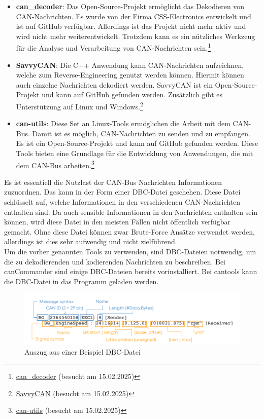 \begin{itemize}
    \item \textbf{can\_decoder}: Das Open-Source-Projekt ermöglicht das Dekodieren von CAN-Nachrichten. Es wurde von der Firma
    CSS-Electronics entwickelt und ist auf GitHub verfügbar. Allerdings ist das Projekt nicht mehr aktiv und wird nicht mehr
    weiterentwickelt. Trotzdem kann es ein nützliches Werkzeug für die Analyse und Verarbeitung von CAN-Nachrichten 
    sein.\footnote{\href{https://github.com/CSS-Electronics/can_decoder}{can\_decoder} (besucht am 15.02.2025)}
    \item \textbf{SavvyCAN}: Die C++ Anwendung kann CAN-Nachrichten aufzeichnen, welche zum Reverse-Engineering genutzt werden können.
    Hiermit können auch einzelne Nachrichten dekodiert werden. SavvyCAN ist ein Open-Source-Projekt und kann auf GitHub gefunden werden. 
    Zusätzlich gibt es Unterstützung auf Linux und Windows.\footnote{\href{https://savvycan.com/index.php}{SavvyCAN} (besucht am 15.02.2025)}
    \item \textbf{can-utils}: Diese Set an Linux-Tools ermöglichen die Arbeit mit dem CAN-Bus. Damit ist es möglich, CAN-Nachrichten 
    zu senden und zu empfangen.
    Es ist ein Open-Source-Projekt und kann auf GitHub gefunden werden. Diese Tools bieten eine Grundlage für die Entwicklung von 
    Anwendungen, die mit dem CAN-Bus arbeiten.\footnote{\href{https://github.com/linux-can/can-utils}{can-utils} (besucht am 15.02.2025)}
\end{itemize}
Es ist essentiell die Nutzlast der CAN-Bus Nachrichten Informationen zuzuordnen. Das kann in der Form einer DBC-Datei geschehen\cite{Choi2021}. 
Diese Datei schlüsselt auf, welche Informationen in den verschiedenen CAN-Nachrichten enthalten sind.
Da auch sensible Informationen in den Nachrichten enthalten sein können, wird diese Datei in den meisten 
Fällen nicht öffentlich verfügbar gemacht. Ohne diese Datei können zwar Brute-Force Ansätze verwendet werden,
allerdings ist dies sehr aufwendig und nicht zielführend. \\
Um die vorher genannten Tools zu verwenden, sind DBC-Dateien notwendig, um die zu dekodierenden und kodierenden Nachrichten zu beschreiben. 
Bei canCommander
sind einige DBC-Dateien bereits vorinstalliert. Bei cantools kann die DBC-Datei in das Programm geladen werden.
\begin{figure}[H]
    \centering
    \includegraphics[scale=0.2]{images/CAN-DBC-File-Format-Explained-Intro-Basics_2.png}
    \caption{Auszug aus einer Beispiel DBC-Datei \cite{cssElectronics}}
    \label{fig:dbcfile}
\end{figure}
